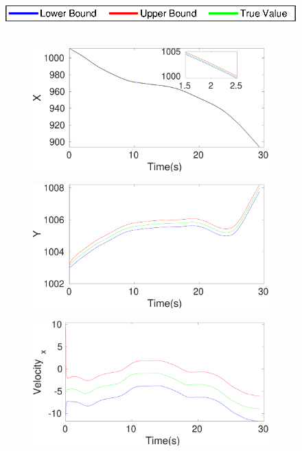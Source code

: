 \begin{figure}[h]
\hspace*{\fill} \includegraphics[scale=0.8]{figures/legend}\\\\
\begin{subfigure}{.5\linewidth}
\centering
\includegraphics[width=\linewidth]{figures/Frad/s3cvSMX}
\end{subfigure}
\begin{subfigure}{.5\linewidth}
\centering
\includegraphics[width=\linewidth]{figures/Frad/s3cvSMY}
\end{subfigure}
\begin{subfigure}{.5\linewidth}
\centering
\includegraphics[width=\linewidth]{figures/Frad/s3cvSMVelocity_x}

\end{subfigure}
\end{figure}

